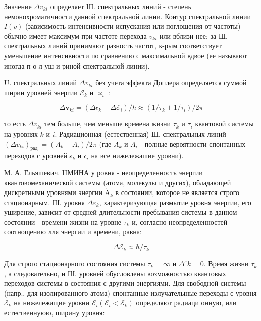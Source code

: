 \documentclass[10pt]{article}
\def\AA{\mathring{\mathrm{A}}}
\begin{document}
Значение $\Delta v_{k i}$ определяет Ш. спектральных линий - степень немонохроматичности данной спектральной линии. Контур спектральной линии $I(v)$ (зависимость интенсивности испускания или поглошения от частоты) обычно имеет максимум при частоте перехода $v_{k i}$ или вблизи нее; за Ш. спектральных линий принимают разность частот, к-рым соответствует уменьшение интенсивности по сравнению с максимальной вдвое (ее называют иногда п о л уш и риной спектральной линии).



U. спектральных линий $\Delta v_{k i}$ без учета эффекта Доплера определяется суммой ширин уровней энергии $\mathscr{E}_{k}$ и $\varkappa_{i}$ :



\[

\Delta \mathbf{v}_{k i}=\left(\Delta \mathscr{c}_{k}-\Delta \mathscr{E}_{i}\right) / h \approx\left(1 / \tau_{k}+1 / \tau_{i}\right) / 2 \pi

\]



то есть $\Delta v_{k i}$ тем больше, чем меныше времена жизни $\tau_{k}$ и $\tau_{i}$ квантовой системы на уровнях $k$ и $i$. Радиационная (естественная) Ш. спектральных линий $\left(\Delta v_{k i}\right)_{\text {рад }}=\left(A_{k}+A_{i}\right) / 2 \pi$ (где $A_{k}$ и $A_{i}$ - полные вероятности спонтанных переходов с уровней $\mathscr{c}_{k}$ и $\mathscr{c}_{i}$ на все нижележашие уровни).



М. А. Ельяшевич. IIМИНА у ровня - неопределенность энергии квантовомеханической системы (атома, молекулы и других), обладающей дискретными уровнями энергии $\AA_{k}$ в состоянии, которое не является строго стационарным. Ш. уровня $\Delta \varepsilon_{k}$, характеризующая размытие уровня энергии, его уширение, зависит от средней длительности пребывания системы в данном состоянии - времени жизни на уровне $\tau_{k}$ и, согласно неопределенностей соотнощению лля энергии и времени, равна:



\[

\Delta \mathscr{E}_{k} \approx \hbar / \tau_{k}

\]



Для строго стационарного состояния системы $\tau_{k}=\infty$ и $\Delta^{\mathscr{\varepsilon}} k=0$. Время жизни $\tau_{k}$, а следовательно, и Ш. уровней обусловлены возможностью квантовых переходов системы в состояния с другими энергиями. Для свободной системы (напр., для изолированного атома) спонтанные излучателыные переходы с уровня $\mathscr{E}_{k}$ на нижележащие уровни $\mathscr{E}_{i}\left(\mathscr{E}_{i}<\mathscr{E}_{k}\right)$ определяют радиаци онную, или естественнуюю, ширину уровня:
\end{document}
